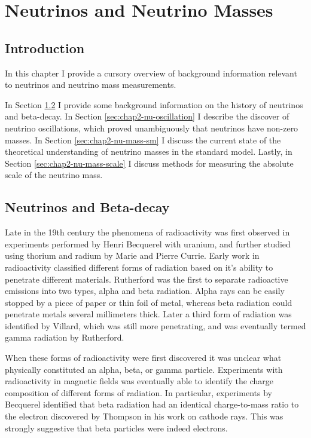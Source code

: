 
\chapter{Neutrinos and Neutrino Masses}

\section{Introduction}

In this chapter I provide a cursory overview of background information relevant to neutrinos and neutrino mass measurements. 

In Section \ref{sec:chap2-nu-history} I provide some background information on the history of neutrinos and beta-decay. In Section \ref{sec:chap2-nu-oscillation} I describe the discover of neutrino oscillations, which proved unambiguously that neutrinos have non-zero masses. In Section \ref{sec:chap2-nu-mass-sm} I discuss the current state of the theoretical understanding of neutrino masses in the standard model. Lastly, in Section \ref{sec:chap2-nu-mass-scale} I discuss methods for measuring the absolute scale of the neutrino mass.

\section{Neutrinos and Beta-decay}
\label{sec:chap2-nu-history}
Late in the 19th century the phenomena of radioactivity was first observed in experiments performed by Henri Becquerel with uranium, and further studied using thorium and radium by Marie and Pierre Currie. Early work in radioactivity classified different forms of radiation based on it's ability to penetrate different materials. Rutherford was the first to separate radioactive emissions into two types, alpha and beta radiation. Alpha rays can be easily stopped by a piece of paper or thin foil of metal, whereas beta radiation could penetrate metals several millimeters thick. Later a third form of radiation was identified by Villard, which was still more penetrating, and was eventually termed gamma radiation by Rutherford. 

When these forms of radioactivity were first discovered it was unclear what physically constituted an alpha, beta, or gamma particle. Experiments with radioactivity in magnetic fields was eventually able to identify the charge composition of different forms of radiation. In particular, experiments by Becquerel identified that beta radiation had an identical charge-to-mass ratio to the electron discovered by Thompson in his work on cathode rays. This was strongly suggestive that beta particles were indeed electrons.

